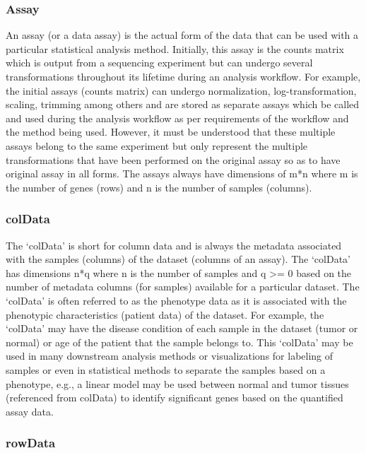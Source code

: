 \documentclass[
]{article}
\begin{document}
\hypertarget{assay}{%
\subsubsection{Assay}\label{assay}}

An assay (or a data assay) is the actual form of the data that can be
used with a particular statistical analysis method. Initially, this
assay is the counts matrix which is output from a sequencing experiment
but can undergo several transformations throughout its lifetime during
an analysis workflow. For example, the initial assays (counts matrix)
can undergo normalization, log-transformation, scaling, trimming among
others and are stored as separate assays which be called and used during
the analysis workflow as per requirements of the workflow and the method
being used. However, it must be understood that these multiple assays
belong to the same experiment but only represent the multiple
transformations that have been performed on the original assay so as to
have original assay in all forms. The assays always have dimensions of
m*n where m is the number of genes (rows) and n is the number of samples
(columns).

\hypertarget{coldata}{%
\subsubsection{colData}\label{coldata}}

The `colData' is short for column data and is always the metadata
associated with the samples (columns) of the dataset (columns of an
assay). The `colData' has dimensions n*q where n is the number of
samples and q \textgreater= 0 based on the number of metadata columns
(for samples) available for a particular dataset. The `colData' is often
referred to as the phenotype data as it is associated with the
phenotypic characteristics (patient data) of the dataset. For example,
the `colData' may have the disease condition of each sample in the
dataset (tumor or normal) or age of the patient that the sample belongs
to. This `colData' may be used in many downstream analysis methods or
visualizations for labeling of samples or even in statistical methods to
separate the samples based on a phenotype, e.g., a linear model may be
used between normal and tumor tissues (referenced from colData) to
identify significant genes based on the quantified assay data.

\hypertarget{rowdata}{%
\subsubsection{rowData}\label{rowdata}}
\end{document}
